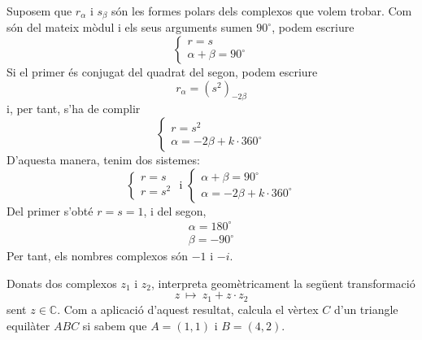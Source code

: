 \begin{solucio}
Suposem que $r_{\alpha }$ i $s_{\beta }$ són les formes polars dels complexos que volem trobar. Com són del mateix mòdul i els seus arguments sumen $90
^{\circ}
$, podem escriure
\[
\left\{
\begin{array}{l}
r=s \\
\alpha +\beta =90
^{\circ}
\end{array}
\right.
\]
Si el primer és conjugat del quadrat del segon, podem escriure
\[
r_{\alpha }=\left( s^{2}\right) _{-2\beta }
\]
i, per tant, s’ha de complir
\[
\left\{
\begin{array}{l}
r=s^{2} \\
\alpha =-2\beta +k\cdot 360
^{\circ}
\end{array}
\right.
\]
D’aquesta manera, tenim dos sistemes:
\[
\left\{
\begin{array}{l}
r=s \\
r=s^{2}
\end{array}
\right. \text{ \ \ \ i \ \ \ }\left\{
\begin{array}{l}
\alpha +\beta =90
^{\circ}
\\
\alpha =-2\beta +k\cdot 360
^{\circ}
\end{array}
\right.
\]
Del primer s’obté $r=s=1$, i del segon,
\[
\begin{array}{l}
\alpha =180
^{\circ}
\\
\beta =-90
^{\circ}
\end{array}
\]
Per tant, els nombres complexos són $-1$ i $-i$.
\end{solucio}

\begin{exercici}
Donats dos complexos $z_{1}$ i $z_{2}$, interpreta geomètricament la
següent transformació
\[
z~\longmapsto ~z_{1}+z\cdot z_{2}
\]
sent $z\in \mathbb{C}$. Com a aplicació d’aquest resultat, calcula el vèrtex $C$ d’un triangle equilàter $ABC$ si sabem que $
A=(1,1)$ i $B=(4,2)$.
\end{exercici}

